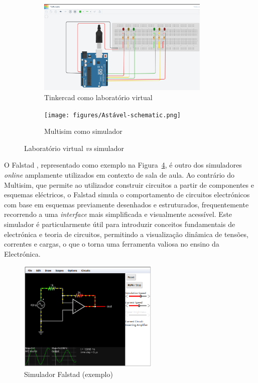 \begin{figure}[hbtp]
    \centering
    \begin{subfigure}[hbtp]{0.48\textwidth}
        \centering
        \includegraphics[width=0.9\textwidth]{figures/tinkercad_exemplo.png}
        \caption{Tinkercad como laboratório virtual \cite{tinkercad}}
        \label{fig:tinkercadVL}
    \end{subfigure}
    \begin{subfigure}[hbtp]{0.48\textwidth}
        \texttt{[image: figures/Astável-schematic.png]}
        \caption{Multisim como simulador \cite{multisim}}
        \label{fig:multisimSimulador}
    \end{subfigure}
    \caption{Laboratório virtual \textit{vs} simulador}
    \label{fig:tinkercad}
\end{figure}

O Falstad \cite{falstad}, representado como exemplo na Figura~\ref{fig:falstad}, é outro dos simuladores \textit{online} amplamente utilizados em contexto de sala de aula. Ao contrário do Multisim, que permite ao utilizador construir circuitos a partir de componentes e esquemas eléctricos, o Falstad simula o comportamento de circuitos electrónicos com base em esquemas previamente desenhados e estruturados, frequentemente recorrendo a uma \textit{interface} mais simplificada e visualmente acessível. Este simulador é particularmente útil para introduzir conceitos fundamentais de electrónica e teoria de circuitos, permitindo a visualização dinâmica de tensões, correntes e cargas, o que o torna uma ferramenta valiosa no ensino da Electrónica.

\begin{figure}[hbtp]
    \centering
    \includegraphics[width=0.6\textwidth]{figures/falstad.png}
    \caption{Simulador Falstad (exemplo) \cite{falstad}}
    \label{fig:falstad}
\end{figure}

